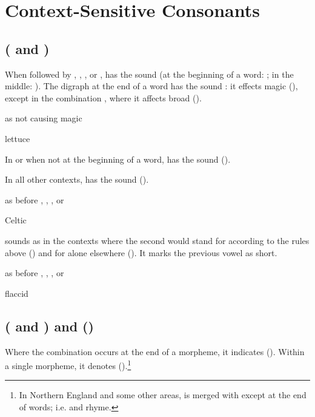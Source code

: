 \section{Context-Sensitive Consonants}

\subsection{ ( and )}

When followed by , , , or ,  has the sound 
(at the beginning of a word: ; in the
middle: ). The digraph  at the end of a
word has the sound : it effects magic  (),
except in the combination , where it affects broad  ().

\begin{exceptions}{ as  not causing magic }
\item lettuce
\end{exceptions}

In  or  when not at the beginning of a word,  has the
sound  ().

In all other contexts,  has the sound  ().

\begin{exceptions}{ as  before , , , or }
\item Celtic
\end{exceptions}

 sounds as  in the contexts where the second  would stand
for  according to the rules above () and for 
alone elsewhere (). It marks the previous vowel as short.

\begin{exceptions}{ as  before , , , or }
\item flaccid
\end{exceptions}

\subsection{ ( and ) and  ()}

Where the combination  occurs at the end of a morpheme, it indicates
 (). Within a single morpheme, it denotes 
().\footnote{In Northern England and some other areas,
 is merged with  except at the end of words; i.e.  and
 rhyme.}

